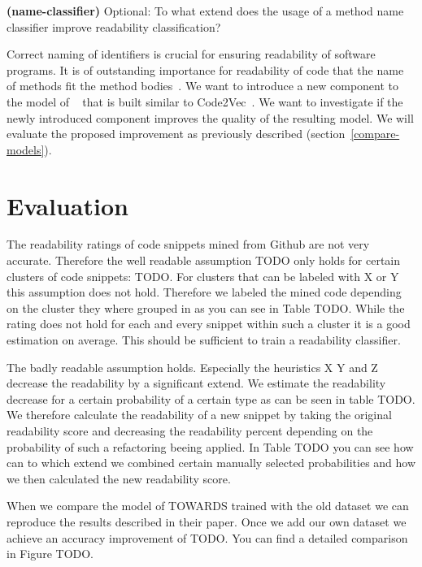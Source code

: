 \documentclass[%
class=scrreprt,
chapterprefix=false,%
open=right,%
twoside=false,%
paper=a4,%
logofile={Logo\_zentral\_farbig\_EN.png},%
thesistype=master,%
UKenglish,%
]{se2thesis}
\begin{document}
	\begin{resq} \textbf{(name-classifier)} Optional: To what extend does the usage of a method name classifier improve readability classification?\end{resq} \label{name-classifier}
	Correct naming of identifiers is crucial for ensuring readability of software programs. It is of outstanding importance for readability of code that the name of methods fit the method bodies~\cite{liu2019learning}. We want to introduce a new component to the model of \citeauthor{mi2022towards}~\cite{mi2022towards} that is built similar to Code2Vec~\cite{alon2019code2vec}. We want to investigate if the newly introduced component improves the quality of the resulting model. We will evaluate the proposed improvement as previously described (section~\ref{compare-models}).
	
	\section{Evaluation} \label{Evaluation}
	The readability ratings of code snippets mined from Github are not very accurate. Therefore the well readable assumption TODO only holds for certain clusters of code snippets: TODO. For clusters that can be labeled with X or Y this assumption does not hold. Therefore we labeled the mined code depending on the cluster they where grouped in as you can see in Table TODO. While the rating does not hold for each and every snippet within such a cluster it is a good estimation on average. This should be sufficient to train a readability classifier.
	
	The badly readable assumption holds. Especially the heuristics X Y and Z decrease the readability by a significant extend. We estimate the readability decrease for a certain probability of a certain type as can be seen in table TODO. We therefore calculate the readability of a new snippet by taking the original readability score and decreasing the readability percent depending on the probability of such a refactoring beeing applied.	In Table TODO you can see how can to which extend we combined certain manually selected probabilities and how we then calculated the new readability score.
	
	When we compare the model of TOWARDS trained with the old dataset we can reproduce the results described in their paper. Once we add our own dataset we achieve an accuracy improvement of TODO. You can find a detailed comparison in Figure TODO.
	
\end{document}
